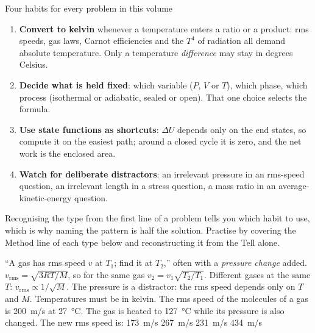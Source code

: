 \begin{methodbox}{Four habits for every problem in this volume}
\begin{enumerate}
\item \textbf{Convert to kelvin} whenever a temperature enters a ratio or a product: rms speeds, gas
      laws, Carnot efficiencies and the $T^4$ of radiation all demand absolute temperature. Only a
      temperature \emph{difference} may stay in degrees Celsius.
\item \textbf{Decide what is held fixed}: which variable ($P$, $V$ or $T$), which phase, which process
      (isothermal or adiabatic, sealed or open). That one choice selects the formula.
\item \textbf{Use state functions as shortcuts}: $\Delta U$ depends only on the end states, so compute it
      on the easiest path; around a closed cycle it is zero, and the net work is the enclosed area.
\item \textbf{Watch for deliberate distractors}: an irrelevant pressure in an rms-speed question, an
      irrelevant length in a stress question, a mass ratio in an average-kinetic-energy question.
\end{enumerate}
Recognising the type from the first line of a problem tells you which habit to use, which is why naming
the pattern is half the solution. Practise by covering the Method line of each type below and
reconstructing it from the Tell alone.
\end{methodbox}

{``A gas has rms speed $v$ at $T_1$; find it at $T_2$,'' often with a \emph{pressure change} added.}
{$v_{\text{rms}}=\sqrt{3RT/M}$, so for the same gas $v_2=v_1\sqrt{T_2/T_1}$. Different gases at the same
$T$: $v_{\text{rms}}\propto1/\sqrt M$.}
{The pressure is a distractor: the rms speed depends only on $T$ and $M$. Temperatures must be in kelvin.}
{The rms speed of the molecules of a gas is \SI{200}{m/s} at \SI{27}{\celsius}. The gas is heated to
\SI{127}{\celsius} while its pressure is also changed. The new rms speed is:}
{\SI{173}{m/s}}
{\SI{267}{m/s}}
{\SI{231}{m/s}}
{\SI{434}{m/s}}

